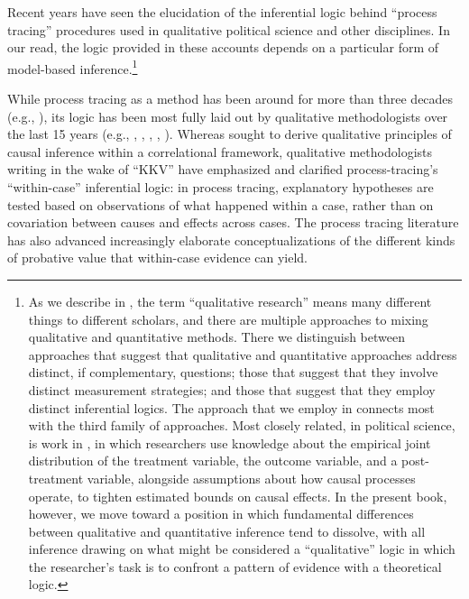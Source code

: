 \documentclass[
  12pt,
]{book}
\begin{document}
Recent years have seen the elucidation of the inferential logic behind ``process tracing'' procedures used in qualitative political science and other disciplines. In our read, the logic provided in these accounts depends on a particular form of model-based inference.\footnote{As we describe in \citet{humphreys2015mixing}, the term ``qualitative research'' means many different things to different scholars, and there are multiple approaches to mixing qualitative and quantitative methods. There we distinguish between approaches that suggest that qualitative and quantitative approaches address distinct, if complementary, questions; those that suggest that they involve distinct measurement strategies; and those that suggest that they employ distinct inferential logics. The approach that we employ in \citet{humphreys2015mixing} connects most with the third family of approaches. Most closely related, in political science, is work in \citet{GlynnQuinn2011}, in which researchers use knowledge about the empirical joint distribution of the treatment variable, the outcome variable, and a post-treatment variable, alongside assumptions about how causal processes operate, to tighten estimated bounds on causal effects. In the present book, however, we move toward a position in which fundamental differences between qualitative and quantitative inference tend to dissolve, with all inference drawing on what might be considered a ``qualitative'' logic in which the researcher's task is to confront a pattern of evidence with a theoretical logic.}

While process tracing as a method has been around for more than three decades (e.g., \citet{george1985case}), its logic has been most fully laid out by qualitative methodologists over the last 15 years (e.g., \citet{bennett2014process}, \citet{george2005case}, \citet{brady2010rethinking}, \citet{Hall2003aligning}, \citet{mahoney2010after}). Whereas \citet{king1994designing} sought to derive qualitative principles of causal inference within a correlational framework, qualitative methodologists writing in the wake of ``KKV'' have emphasized and clarified process-tracing's ``within-case'' inferential logic: in process tracing, explanatory hypotheses are tested based on observations of what happened within a case, rather than on covariation between causes and effects across cases. The process tracing literature has also advanced increasingly elaborate conceptualizations of the different kinds of probative value that within-case evidence can yield.
\end{document}
